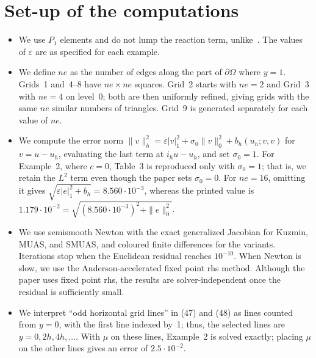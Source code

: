 \documentclass[11pt]{article}
\begin{document}
\section{Set-up of the computations}\label{sec:setup}

\begin{itemize}[leftmargin=*]
\item We use $P_1$ elements and do not lump the reaction term, unlike~\cite{BJK16}. The values of $\varepsilon$ are
  as specified for each example.
\item We define $ne$ as the number of edges along the part of $\partial\Omega$ where $y=1$. Grids~1 and~4--8 have
  $ne\times ne$ squares. Grid~2 starts with $ne=2$ and Grid~3 with $ne=4$ on level~0; both are then uniformly
  refined, giving grids with the same $ne$ similar numbers of triangles. Grid~9 is generated separately for each
  value of $ne$.
\item We compute the error norm
  $\|v\|_h^2=\varepsilon|v|_1^2+\sigma_0\|v\|_0^2+b_h(u_h;v,v)$ for $v=u-u_h$, evaluating the last term at
  $i_hu-u_h$, and set $\sigma_0=1$. For Example~2, where $c=0$, Table~3 is reproduced only with $\sigma_0=1$; that
  is, we retain the $L^2$ term even though the paper sets $\sigma_0=0$. For $ne=16$, omitting it gives
  $\sqrt{\varepsilon|e|_1^2+b_h}=8.560\cdot10^{-3}$, whereas the printed value is
  $1.179\cdot10^{-2}=\sqrt{(8.560\cdot10^{-3})^2+\|e\|_0^2}$.
\item We use semismooth Newton with the exact generalized Jacobian for Kuzmin, MUAS, and SMUAS, and coloured finite
  differences for the variants. Iterations stop when the Euclidean residual reaches $10^{-10}$. When Newton is
  slow, we use the Anderson-accelerated fixed point rhs method. Although the paper uses fixed point rhs, the results
  are solver-independent once the residual is sufficiently small.
\item We interpret ``odd horizontal grid lines'' in (47) and (48) as lines counted from $y=0$, with the first line
  indexed by~1; thus, the selected lines are $y=0,2h,4h,\dots$. With $\mu$ on these lines, Example~2 is solved
  exactly; placing $\mu$ on the other lines gives an error of $2.5\cdot10^{-2}$.
\end{itemize}

\end{document}
